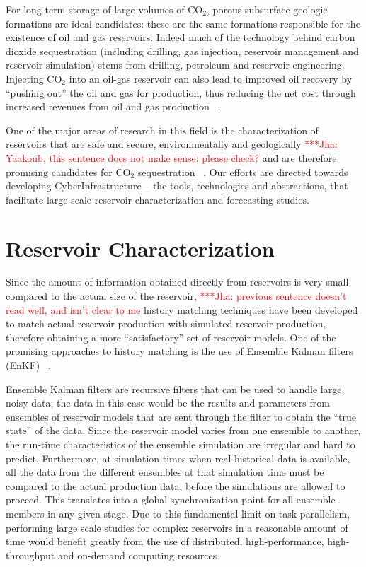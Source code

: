 \documentclass[10pt,conference,final]{IEEEtran}
\newcommand{\jhanote}[1]{ {\textcolor{red} { ***Jha: #1 }}}
\newcommand{\jhanote}[1]{}
\begin{document}
For long-term storage of large volumes of CO$_2$, porous subsurface geologic formations are ideal candidates: these are the same formations responsible for the existence of oil and gas reservoirs. Indeed much of the technology behind carbon dioxide sequestration (including drilling, gas injection, reservoir management and reservoir simulation) stems from drilling, petroleum and reservoir engineering. Injecting CO$_2$ into an oil-gas reservoir can also lead to improved oil recovery by ``pushing out'' the oil and gas for production, thus reducing the net cost through increased revenues from oil and gas production ~\cite{EORBook}.

One of the major areas of research in this field is the characterization of reservoirs that are safe and secure, environmentally and geologically \jhanote{Yaakoub, this sentence does not make sense: please check?} and are therefore promising candidates for CO$_2$ sequestration ~\cite{GeoRPT,Luigi}. Our efforts are directed towards developing CyberInfrastructure -- the tools, technologies and abstractions, that facilitate large scale reservoir characterization and forecasting studies.

\section*{Reservoir Characterization}

Since the amount of information obtained directly from reservoirs is very small compared to the actual size of the reservoir, \jhanote{previous sentence doesn't read well, and isn't clear to me} history matching techniques have been developed to match actual reservoir production with simulated reservoir production, therefore obtaining a more ``satisfactory'' set of reservoir models. One of the promising approaches to history matching is the use of Ensemble Kalman filters (EnKF) ~\cite{KalmanPaper, DO2007, LiEnKF07, DO2006}.

Ensemble Kalman filters are recursive filters that can be used to handle large, noisy data; the data in this case would be the results and parameters from ensembles of reservoir models that are sent through the filter to obtain the ``true state'' of the data. Since the reservoir model varies from one ensemble to another, the run-time characteristics of the ensemble simulation are irregular and hard to predict. Furthermore, at simulation times when real historical data is available, all the data from the different ensembles at that simulation time must be compared to the actual production data, before the simulations are allowed to proceed. This translates into a global synchronization point for all ensemble-members in any given stage. Due to this fundamental limit on task-parallelism, performing large scale studies for complex reservoirs in a reasonable amount of time would benefit greatly from the use of distributed, high-performance, high-throughput and on-demand computing resources.
\end{document}
